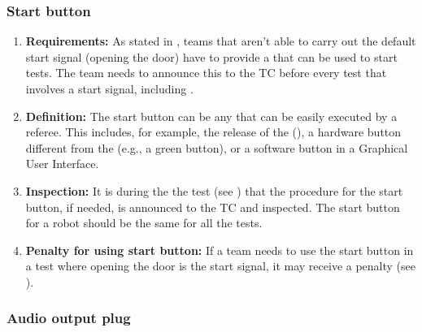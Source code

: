 \subsubsection{Start button}
\label{rule:start_button}

\begin{enumerate}
	\item \textbf{Requirements:} As stated in , teams that aren't able to carry out the default start signal (opening the door) have to provide a  that can be used to start tests. The team needs to announce this to the TC before every test that involves a start signal, including .
	\item \textbf{Definition:} The start button can be any  that can be easily executed by a referee.  This includes, for example, the release of the  (), a hardware button different from the  (e.g., a green button), or a software button in a Graphical User Interface. 
	\item \textbf{Inspection:} It is during the the  test (see ) that the procedure for the start button, if needed, is announced to the TC and inspected. The start button for a robot should be the same for all the tests.
	\item \textbf{Penalty for using start button:} If a team needs to use the start button in a test where opening the door is the start signal, it may receive a penalty (see ).
\end{enumerate}



\subsubsection{Audio output plug}\label{rule:roobt_audio_out}

